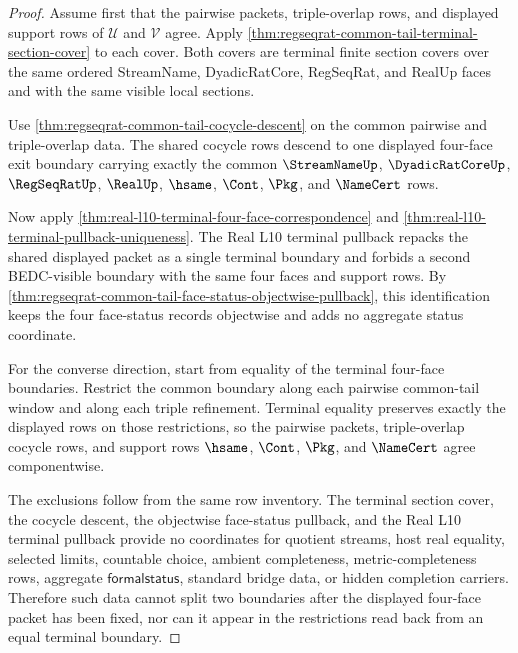 \begin{proof}
Assume first that the pairwise packets, triple-overlap rows, and displayed support rows of $\mathcal U$ and $\mathcal V$ agree. Apply \autoref{thm:regseqrat-common-tail-terminal-section-cover} to each cover. Both covers are terminal finite section covers over the same ordered StreamName, DyadicRatCore, RegSeqRat, and RealUp faces and with the same visible local sections.

Use \autoref{thm:regseqrat-common-tail-cocycle-descent} on the common pairwise and triple-overlap data. The shared cocycle rows descend to one displayed four-face exit boundary carrying exactly the common $\StreamNameUp$, $\DyadicRatCoreUp$, $\RegSeqRatUp$, $\RealUp$, $\hsame$, $\Cont$, $\Pkg$, and $\NameCert$ rows.

Now apply \autoref{thm:real-l10-terminal-four-face-correspondence} and \autoref{thm:real-l10-terminal-pullback-uniqueness}. The Real L10 terminal pullback repacks the shared displayed packet as a single terminal boundary and forbids a second BEDC-visible boundary with the same four faces and support rows. By \autoref{thm:regseqrat-common-tail-face-status-objectwise-pullback}, this identification keeps the four face-status records objectwise and adds no aggregate status coordinate.

For the converse direction, start from equality of the terminal four-face boundaries. Restrict the common boundary along each pairwise common-tail window and along each triple refinement. Terminal equality preserves exactly the displayed rows on those restrictions, so the pairwise packets, triple-overlap cocycle rows, and support rows $\hsame$, $\Cont$, $\Pkg$, and $\NameCert$ agree componentwise.

The exclusions follow from the same row inventory. The terminal section cover, the cocycle descent, the objectwise face-status pullback, and the Real L10 terminal pullback provide no coordinates for quotient streams, host real equality, selected limits, countable choice, ambient completeness, metric-completeness rows, aggregate $\mathsf{formalstatus}$, standard bridge data, or hidden completion carriers. Therefore such data cannot split two boundaries after the displayed four-face packet has been fixed, nor can it appear in the restrictions read back from an equal terminal boundary.
\end{proof}

